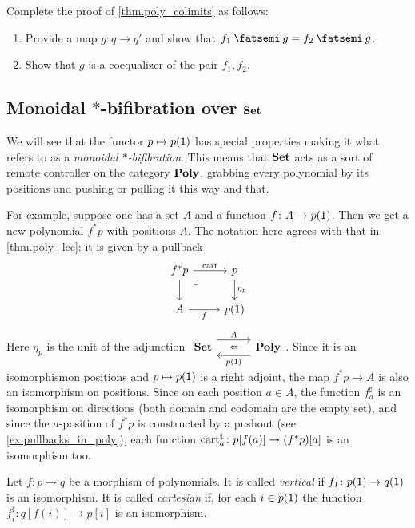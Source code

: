 \documentclass[DynamicalBook]{subfiles}
\begin{document}
\begin{exercise}\label{exc.poly_colimits}
Complete the proof of \cref{thm.poly_colimits} as follows:
\begin{enumerate}
	\item Provide a map $g\colon q\to q'$ and show that $f_1\then g=f_2\then g$.
	\item Show that $g$ is a coequalizer of the pair $f_1,f_2$.
\qedhere
\end{enumerate}
\end{exercise}


\subsection{Monoidal $*$-bifibration over $\textbf{Set}$}

We will see that the functor $p\mapsto p(\textsf{1})$ has special properties making it what
\cite{shulman2008framed} refers to as a \emph{monoidal $*$-bifibration}. This means that $\textbf{Set}$ acts as a sort of remote controller on the category $\textbf{Poly}$, grabbing every polynomial by its positions and pushing or pulling it this way and that. 

For example, suppose one has a set $A$ and a function $f\colon A\to p(\textsf{1})$. Then we get a new polynomial $f^*p$ with positions $A$. The notation here agrees with that in \cref{thm.poly_lcc}: it is given by a pullback
\[
\begin{tikzcd}
	f^*p\ar[r, "\fun{cart}"]\ar[d]&
	p\ar[d, "\eta_p"]\\
	A\ar[r, "f"']&
	p(\1)\ar[ul, phantom, very near end, "\lrcorner"]
\end{tikzcd}
\]
Here $\eta_p$ is the unit of the adjunction $\adjr{\smset}{A}{p(\1)}{\poly}$. Since it is an isomorphismon positions and $p\mapsto p(\textsf{1})$ is a right adjoint, the map $f^*p\to A$ is also an isomorphism on positions. Since on each position $a\in A$, the function $f^\sharp_a$ is an isomorphism on directions (both domain and codomain are the empty set), and since the $a$-position of $f^*p$ is constructed by a pushout (see \cref{ex.pullbacks_in_poly}), each function $\mathrm{cart}_a^\sharp\colon p[f(a)]\to(f^*p)[a]$ is an isomorphism too.

\begin{definition}
Let $f\colon p\to q$ be a morphism of polynomials. It is called \emph{vertical} if $f_1\colon p(\textsf{1})\to q(\textsf{1})$ is an isomorphism. It is called \emph{cartesian} if, for each $i\in p(\textsf{1})$ the function $f^\sharp_i\colon q[f(i)]\to p[i]$ is an isomorphism.
\end{definition}
\end{document}
